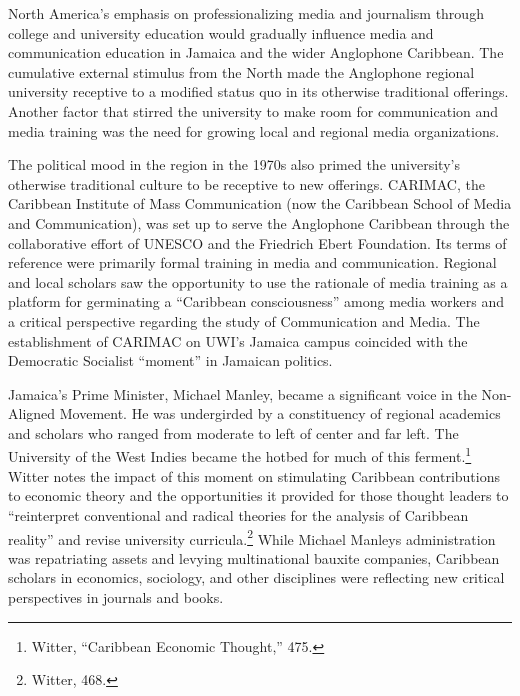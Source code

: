 \documentclass{tufte-handout}
\begin{document}
North America's emphasis on professionalizing media and journalism
through college and university education would gradually influence media
and communication education in Jamaica and the wider Anglophone
Caribbean. The cumulative external stimulus from the North made the
Anglophone regional university receptive to a modified status quo in its
otherwise traditional offerings. Another factor that stirred the
university to make room for communication and media training was the
need for growing local and regional media organizations.

The political mood in the region in the 1970s also primed the
university's otherwise traditional culture to be receptive to new
offerings. CARIMAC, the Caribbean Institute of Mass Communication (now
the Caribbean School of Media and Communication), was set up to serve
the Anglophone Caribbean through the collaborative effort of UNESCO and
the Friedrich Ebert Foundation. Its terms of reference were primarily
formal training in media and communication. Regional and local scholars
saw the opportunity to use the rationale of media training as a platform
for germinating a ``Caribbean consciousness'' among media workers and a
critical perspective regarding the study of Communication and Media. The
establishment of CARIMAC on UWI's Jamaica campus coincided with the
Democratic Socialist ``moment'' in Jamaican politics.

Jamaica's Prime Minister, Michael Manley, became a significant voice in
the Non-Aligned Movement. He was undergirded by a constituency of
regional academics and scholars who ranged from moderate to left of
center and far left. The University of the West Indies became the hotbed
for much of this ferment.\footnote{Witter, ``Caribbean Economic
  Thought,'' 475.} Witter notes the impact of this moment on stimulating
Caribbean contributions to economic theory and the opportunities it
provided for those thought leaders to ``reinterpret conventional and
radical theories for the analysis of Caribbean reality'' and revise
university curricula.\footnote{Witter, 468.} While Michael
Manley\textquotesingle s administration was repatriating assets and
levying multinational bauxite companies, Caribbean scholars in
economics, sociology, and other disciplines were reflecting new critical
perspectives in journals and books.

\enlargethispage{\baselineskip}
\end{document}
